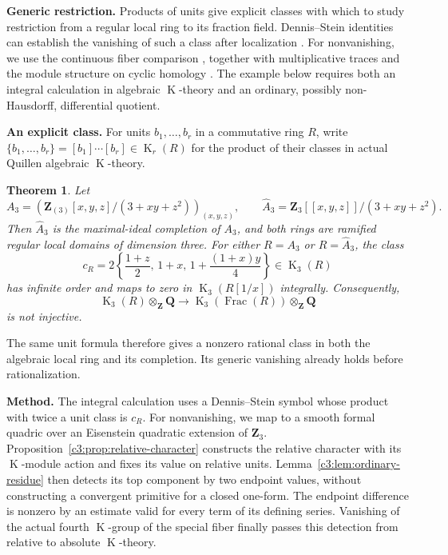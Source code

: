 \documentclass[11pt,a4paper]{amsart}
\numberwithin{equation}{section}
\newtheorem{theorem}{Theorem}[section]
\theoremstyle{definition}
\theoremstyle{remark}
\newcommand{\CthreeZ}{\mathbf{Z}}
\newcommand{\CthreeQ}{\mathbf{Q}}
\DeclareMathOperator{\CthreeK}{K}
\DeclareMathOperator{\CthreeFrac}{Frac}
\begin{document}
\medskip
\noindent\textbf{Generic restriction.}
Products of units give explicit classes with which to study restriction
from a regular local ring to its fraction field. Dennis--Stein identities
can establish the vanishing of such a class after localization
\cite[III, Definition~5.11 and Theorem~5.11.1]{Weibel}.
For nonvanishing, we use the continuous fiber comparison
\cite[Proposition~4.10]{AMMN}, together with multiplicative traces and
the module structure on cyclic homology
\cite{BGTTrace,NikolausScholze,HoyoisCircle,BokstedtOttosen}.
The example below requires both an integral calculation in algebraic
$\CthreeK$-theory and an ordinary, possibly non-Hausdorff, differential quotient.

\medskip
\noindent\textbf{An explicit class.}
For units $b_1,\ldots,b_r$ in a commutative ring $R$, write
$\{b_1,\ldots,b_r\}=[b_1]\cdots[b_r]\in\CthreeK_r(R)$ for the product of their
classes in actual Quillen algebraic $\CthreeK$-theory.

\begin{theorem}
\label{thm:explicit-three-dimensional}
Let
\[
 A_3=
 \left(\CthreeZ_{(3)}[x,y,z]/(3+xy+z^2)\right)_{(x,y,z)},
 \qquad
 \widehat A_3=\CthreeZ_3[[x,y,z]]/(3+xy+z^2).
\]
Then $\widehat A_3$ is the maximal-ideal completion of $A_3$, and both
rings are ramified regular local domains of dimension three.
For either $R=A_3$ or $R=\widehat A_3$, the class
\[
 c_R=
 2\left\{\frac{1+z}{2},\,1+x,\,
              1+\frac{(1+x)y}{4}\right\}\in\CthreeK_3(R)
\]
has infinite order and maps to zero in $\CthreeK_3(R[1/x])$ integrally.
Consequently,
\[
 \CthreeK_3(R)\otimes_{\CthreeZ}\CthreeQ
 \longrightarrow
 \CthreeK_3(\CthreeFrac(R))\otimes_{\CthreeZ}\CthreeQ
\]
is not injective.
\end{theorem}

The same unit formula therefore gives a nonzero rational class in both
the algebraic local ring and its completion. Its generic vanishing
already holds before rationalization.

\medskip
\noindent\textbf{Method.}
The integral calculation uses a Dennis--Stein symbol whose product with
twice a unit class is $c_R$.
For nonvanishing, we map to a smooth formal quadric over an Eisenstein
quadratic extension of $\CthreeZ_3$.
Proposition~\ref{c3:prop:relative-character} constructs the relative
character with its $\CthreeK$-module action and fixes its value on relative
units. Lemma~\ref{c3:lem:ordinary-residue} then detects its top component by
two endpoint values, without constructing a convergent primitive for a
closed one-form. The endpoint difference is nonzero by an estimate
valid for every term of its defining series.
Vanishing of the actual fourth $\CthreeK$-group of the special fiber finally
passes this detection from relative to absolute $\CthreeK$-theory.
\end{document}
